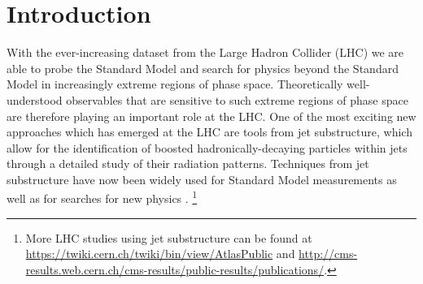 \documentclass[11pt,letterpaper]{article}
\begin{document}
\maketitle

\section{Introduction}\label{sec:intro}



With the ever-increasing dataset from the Large Hadron Collider (LHC) we are able to probe the Standard Model and search for physics beyond the Standard Model in increasingly extreme regions of phase space.
%
Theoretically well-understood observables that are sensitive to such extreme regions of phase space are therefore playing an important role at the LHC.
%
One of the most exciting new approaches which has emerged at the LHC are tools from jet substructure, which allow for the identification of boosted hadronically-decaying particles within jets through a detailed study of their radiation patterns.
%
Techniques from jet substructure have now been widely used for Standard Model measurements \cite{Chatrchyan:2012sn,CMS:2013cda,Aad:2015cua,Aad:2015lxa,ATLAS-CONF-2015-035,Aad:2015rpa,Aad:2015hna,ATLAS-CONF-2016-002,ATLAS-CONF-2016-039,ATLAS-CONF-2016-034,CMS-PAS-TOP-16-013,CMS-PAS-HIG-16-004} as well as for searches for new physics  \cite{CMS:2011bqa,Fleischmann:2013woa,Pilot:2013bla,TheATLAScollaboration:2013qia,Chatrchyan:2012ku,CMS-PAS-B2G-14-001,CMS-PAS-B2G-14-002,Khachatryan:2015axa,Khachatryan:2015bma,Aad:2015owa,Aaboud:2016okv,Aaboud:2016trl,Aaboud:2016qgg,ATLAS-CONF-2016-055,ATLAS-CONF-2015-071,ATLAS-CONF-2015-068,CMS-PAS-EXO-16-037,CMS-PAS-EXO-16-040,Khachatryan:2016mdm,CMS-PAS-HIG-16-016,CMS-PAS-B2G-15-003,CMS-PAS-EXO-16-017}.%
\footnote{More LHC studies using jet substructure can be found at \url{https://twiki.cern.ch/twiki/bin/view/AtlasPublic} and \url{http://cms-results.web.cern.ch/cms-results/public-results/publications/}.} 
\end{document}
